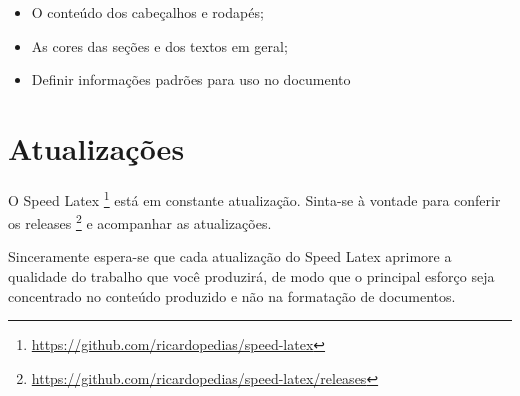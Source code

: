 \begin{itemize}

    \item O conteúdo dos cabeçalhos e rodapés;
    \item As cores das seções e dos textos em geral;
    \item Definir informações padrões para uso no documento

\end{itemize}

\section{Atualizações}

O Speed Latex \footnote{\url{https://github.com/ricardopedias/speed-latex}} está em constante atualização. Sinta-se à vontade para conferir os releases \footnote{\url{https://github.com/ricardopedias/speed-latex/releases}} e acompanhar as atualizações.

Sinceramente espera-se que cada atualização do Speed Latex aprimore a qualidade do trabalho que você produzirá, de modo que o principal esforço seja concentrado no conteúdo produzido e não na formatação de documentos.
